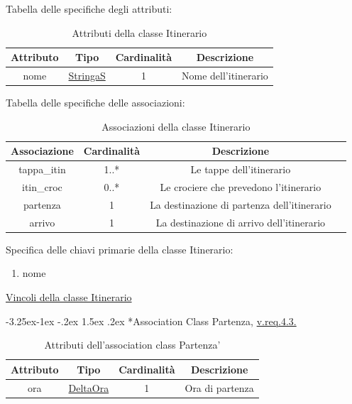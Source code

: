 \documentclass{article}
\makeatletter
\renewcommand\subsection{\@startsection{subsection}{2}{\z@}%
                                     {-3.25ex\@plus -1ex \@minus -.2ex}%
                                     {1.5ex \@plus .2ex}%
                                     {\normalfont\normalsize\bfseries}}
\makeatother
\begin{document}
Tabella delle specifiche degli attributi:
\begin{table}[h!]
    \centering
    \begin{tabular}{|c|c|c|c|}
        \hline
        Attributo & Tipo & Cardinalità & Descrizione \\
        \hline
        nome & \hyperref[sec:StringaS]{StringaS} & 1 & Nome dell'itinerario \\
        \hline
    \end{tabular}
    \caption{Attributi della classe Itinerario}
\end{table}

Tabella delle specifiche delle associazioni:
\begin{table}[h!]
    \centering
    \begin{tabular}{|c|c|c|c|}
        \hline
        Associazione & Cardinalità & Descrizione \\
        \hline
        tappa\_itin & 1..* & Le tappe dell'itinerario \\
        itin\_croc & 0..* & Le crociere che prevedono l'itinerario \\
        partenza & 1 & La destinazione di partenza dell'itinerario \\
        arrivo & 1 & La destinazione di arrivo dell'itinerario \\
        \hline
    \end{tabular}
    \caption{Associazioni della classe Itinerario} 
\end{table}

Specifica delle chiavi primarie della classe Itinerario:
\begin{enumerate}
    \item nome
\end{enumerate}

\hyperref[sec:VincoliItinerario]{Vincoli della classe Itinerario}

\newpage
\subsection*{Association Class Partenza, \hyperref[sec:RequisitiItinerarioDestinazioneDiPartenza]{v.req.4.3.}}

\begin{table}[h!]
    \centering
    \begin{tabular}{|c|c|c|c|}
        \hline
        Attributo & Tipo & Cardinalità & Descrizione \\
        \hline
        ora & \hyperref[sec:DeltaOra]{DeltaOra} & 1 & Ora di partenza \\
        \hline
    \end{tabular}
    \caption{Attributi dell'association class Partenza'}
\end{table}
\end{document}
